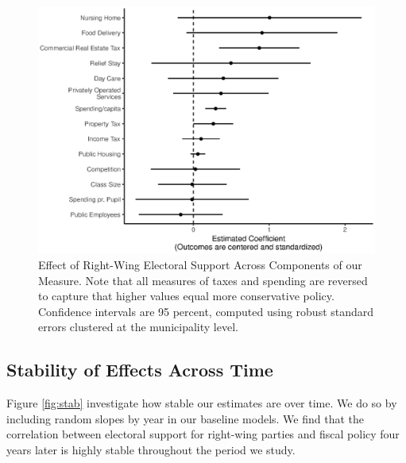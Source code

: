 \documentclass[a4paper,12pt]{article}
\begin{document}
\begin{figure}[!htb]
	\centering
	\includegraphics[scale = 1]{ItemByItem_18092018.eps}
	\caption{Effect of Right-Wing Electoral Support Across Components of our Measure. Note that all measures of taxes and spending are reversed to capture that higher values equal more conservative policy. Confidence intervals are 95 percent, computed using robust standard errors clustered at the municipality level.} \label{fig:item}
\end{figure}
\clearpage



\subsection{Stability of Effects Across Time}
\label{stability}

Figure \ref{fig:stab} investigate how stable our estimates are over time. We do so by including random slopes by year in our baseline models. We find that the correlation between electoral support for right-wing parties and fiscal policy four years later is highly stable throughout the period we study.
\end{document}
